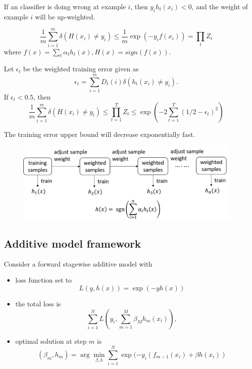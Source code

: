 \begin{refsection}
\begin{remark}
	If an classifier is doing wrong at example $i$, then $y_i h_t(x_i) < 0$, and the weight of example $i$ will be up-weighted.
\end{remark}



\begin{lemma}
$$\frac{1}{m}\sum_{i=1}^m \delta(H(x_i)\neq y_i) \leq \frac{1}{m}\exp(-y_i f(x_i)) = \prod_t Z_t$$
where $f(x) = \sum_t \alpha_t h_t(x), H(x) = sign(f(x)).$

Let $\epsilon_t$ be the weighted training error given as
$$\epsilon_t = \sum_{i=1}^m D_t(i) \delta(h_t(x_i) \neq y_i).$$
If $\epsilon_t < 0.5$, then
$$\frac{1}{m}\sum_{i=1}^m \delta(H(x_i)\neq y_i) \leq  \prod_{t=1}^T Z_t \leq \exp(-2\sum_{t=1}^T(1/2 - \epsilon_t)^2)$$
\end{lemma}


\begin{remark}[interpretation]
The training error upper bound will decrease exponentially fast.
\end{remark}


\begin{figure}[H]
	\centering
	\includegraphics[width=1\linewidth]{../figures/statisticalLearning/ensembleMethods/boostingLearningScheme}
	\caption{}
	\label{fig:boostinglearningscheme}
\end{figure}



\subsection{Additive model framework}



Consider a forward stagewise additive model with
\begin{itemize}
	\item loss function set to 
	$$L(y,h(x)) = \exp(-yh(x))$$
	\item the total loss is
	$$\sum_{i=1}^N L(y_i, \sum_{m=1}^M \beta_Mh_m(x_i)),$$
	\item optimal solution at step $m$ is
	$$(\beta_m,h_m) = \arg\min_{\beta,h} \sum_{i=1}^N \exp(-y_i(f_{m-1}(x_i)+\beta h(x_i))$$
\end{itemize}


\end{refsection}
